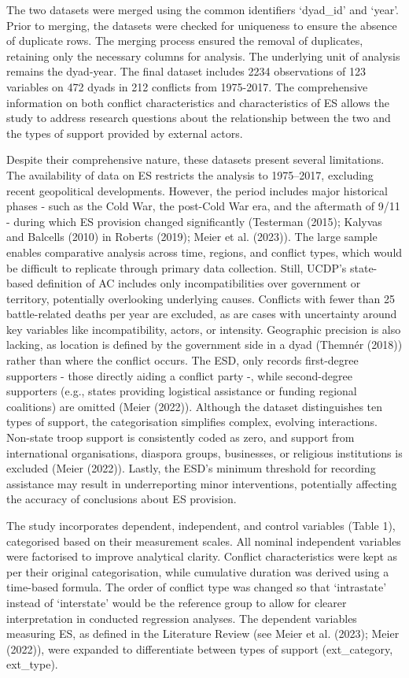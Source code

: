 \documentclass[
]{article}
\begin{document}
The two datasets were merged using the common identifiers `dyad\_id' and
`year'. Prior to merging, the datasets were checked for uniqueness to
ensure the absence of duplicate rows. The merging process ensured the
removal of duplicates, retaining only the necessary columns for
analysis. The underlying unit of analysis remains the dyad-year. The
final dataset includes 2234 observations of 123 variables on 472 dyads
in 212 conflicts from 1975-2017. The comprehensive information on both
conflict characteristics and characteristics of ES allows the study to
address research questions about the relationship between the two and
the types of support provided by external actors.

Despite their comprehensive nature, these datasets present several
limitations. The availability of data on ES restricts the analysis to
1975--2017, excluding recent geopolitical developments. However, the
period includes major historical phases - such as the Cold War, the
post-Cold War era, and the aftermath of 9/11 - during which ES provision
changed significantly (Testerman (2015); Kalyvas and Balcells (2010) in
Roberts (2019); Meier et al. (2023)). The large sample enables
comparative analysis across time, regions, and conflict types, which
would be difficult to replicate through primary data collection. Still,
UCDP's state-based definition of AC includes only incompatibilities over
government or territory, potentially overlooking underlying causes.
Conflicts with fewer than 25 battle-related deaths per year are
excluded, as are cases with uncertainty around key variables like
incompatibility, actors, or intensity. Geographic precision is also
lacking, as location is defined by the government side in a dyad
(Themnér (2018)) rather than where the conflict occurs. The ESD, only
records first-degree supporters - those directly aiding a conflict party
-, while second-degree supporters (e.g., states providing logistical
assistance or funding regional coalitions) are omitted (Meier (2022)).
Although the dataset distinguishes ten types of support, the
categorisation simplifies complex, evolving interactions. Non-state
troop support is consistently coded as zero, and support from
international organisations, diaspora groups, businesses, or religious
institutions is excluded (Meier (2022)). Lastly, the ESD's minimum
threshold for recording assistance may result in underreporting minor
interventions, potentially affecting the accuracy of conclusions about
ES provision.

The study incorporates dependent, independent, and control variables
(Table 1), categorised based on their measurement scales. All nominal
independent variables were factorised to improve analytical clarity.
Conflict characteristics were kept as per their original categorisation,
while cumulative duration was derived using a time-based formula. The
order of conflict type was changed so that `intrastate' instead of
`interstate' would be the reference group to allow for clearer
interpretation in conducted regression analyses. The dependent variables
measuring ES, as defined in the Literature Review (see Meier et al.
(2023); Meier (2022)), were expanded to differentiate between types of
support (ext\_category, ext\_type).
\end{document}
